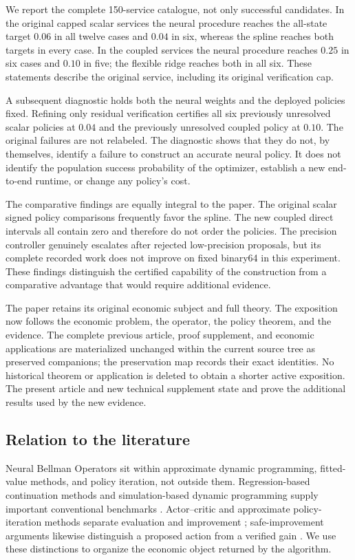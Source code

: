\documentclass[ecta,nameyear,draft]{econsocart}
\begin{document}
We report the complete 150-service catalogue, not only successful candidates. In the original capped scalar services the neural procedure reaches the all-state target $0.06$ in all twelve cases and $0.04$ in six, whereas the spline reaches both targets in every case. In the coupled services the neural procedure reaches $0.25$ in six cases and $0.10$ in five; the flexible ridge reaches both in all six. These statements describe the original service, including its original verification cap.

A subsequent diagnostic holds both the neural weights and the deployed policies fixed. Refining only residual verification certifies all six previously unresolved scalar policies at $0.04$ and the previously unresolved coupled policy at $0.10$. The original failures are not relabeled. The diagnostic shows that they do not, by themselves, identify a failure to construct an accurate neural policy. It does not identify the population success probability of the optimizer, establish a new end-to-end runtime, or change any policy's cost.

The comparative findings are equally integral to the paper. The original scalar signed policy comparisons frequently favor the spline. The new coupled direct intervals all contain zero and therefore do not order the policies. The precision controller genuinely escalates after rejected low-precision proposals, but its complete recorded work does not improve on fixed binary64 in this experiment. These findings distinguish the certified capability of the construction from a comparative advantage that would require additional evidence.

The paper retains its original economic subject and full theory. The exposition now follows the economic problem, the operator, the policy theorem, and the evidence. The complete previous article, proof supplement, and economic applications are materialized unchanged within the current source tree as preserved companions; the preservation map records their exact identities. No historical theorem or application is deleted to obtain a shorter active exposition. The present article and new technical supplement state and prove the additional results used by the new evidence.

\subsection{Relation to the literature}
Neural Bellman Operators sit within approximate dynamic programming, fitted-value methods, and policy iteration, not outside them. Regression-based continuation methods and simulation-based dynamic programming supply important conventional benchmarks \citep{judd1998,powell2011,longstaff2001,ernst2005}. Actor--critic and approximate policy-iteration methods separate evaluation and improvement \citep{konda1999,scherrer2015}; safe-improvement arguments likewise distinguish a proposed action from a verified gain \citep{kakade2002,pirotta2013}. We use these distinctions to organize the economic object returned by the algorithm.
\end{document}
